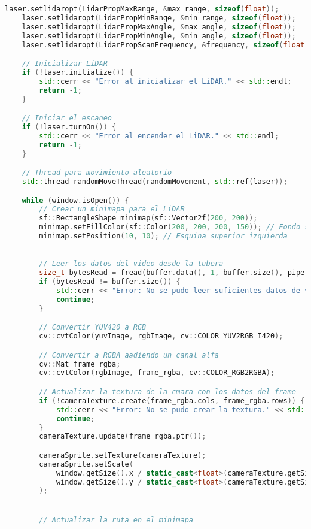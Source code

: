 \begin{lstlisting}[language={C++}, caption={Primer ajuste de c\'odigo}, label={Script}]
    laser.setlidaropt(LidarPropMaxRange, &max_range, sizeof(float));
    laser.setlidaropt(LidarPropMinRange, &min_range, sizeof(float));
    laser.setlidaropt(LidarPropMaxAngle, &max_angle, sizeof(float));
    laser.setlidaropt(LidarPropMinAngle, &min_angle, sizeof(float));
    laser.setlidaropt(LidarPropScanFrequency, &frequency, sizeof(float));

    // Inicializar LiDAR
    if (!laser.initialize()) {
        std::cerr << "Error al inicializar el LiDAR." << std::endl;
        return -1;
    }

    // Iniciar el escaneo
    if (!laser.turnOn()) {
        std::cerr << "Error al encender el LiDAR." << std::endl;
        return -1;
    }

    // Thread para movimiento aleatorio
    std::thread randomMoveThread(randomMovement, std::ref(laser));

    while (window.isOpen()) {
        // Crear un minimapa para el LiDAR
        sf::RectangleShape minimap(sf::Vector2f(200, 200));
        minimap.setFillColor(sf::Color(200, 200, 200, 150)); // Fondo semitransparente
        minimap.setPosition(10, 10); // Esquina superior izquierda
        

        // Leer los datos del video desde la tubera
        size_t bytesRead = fread(buffer.data(), 1, buffer.size(), pipe);
        if (bytesRead != buffer.size()) {
            std::cerr << "Error: No se pudo leer suficientes datos de video." << std::endl;
            continue;
        }

        // Convertir YUV420 a RGB
        cv::cvtColor(yuvImage, rgbImage, cv::COLOR_YUV2RGB_I420);

        // Convertir a RGBA aadiendo un canal alfa
        cv::Mat frame_rgba;
        cv::cvtColor(rgbImage, frame_rgba, cv::COLOR_RGB2RGBA);

        // Actualizar la textura de la cmara con los datos del frame
        if (!cameraTexture.create(frame_rgba.cols, frame_rgba.rows)) {
            std::cerr << "Error: No se pudo crear la textura." << std::endl;
            continue;
        }
        cameraTexture.update(frame_rgba.ptr());

        cameraSprite.setTexture(cameraTexture);
        cameraSprite.setScale(
            window.getSize().x / static_cast<float>(cameraTexture.getSize().x),
            window.getSize().y / static_cast<float>(cameraTexture.getSize().y)
        );


        // Actualizar la ruta en el minimapa
        

\end{lstlisting}
